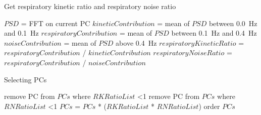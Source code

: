                     \begin{algorithm}
                        \caption{Get respiratory kinetic ratio and respiratory noise ratio}
                        \;
                        $PSD$ = \gls{FFT} on current \gls{PC}\;
                        \;
                        $kineticContribution$ = mean of $PSD$ between \SI{0.0}{\hertz} and \SI{0.1}{\hertz}\;
                        $respiratoryContribution$ = mean of $PSD$ between \SI{0.1}{\hertz} and \SI{0.4}{\hertz}\;
                        $noiseContribution$ = mean of $PSD$ above \SI{0.4}{\hertz}\;
                        \;
                        $respiratoryKineticRatio$ = $respiratoryContribution$ / $kineticContribution$\;
                        $respiratoryNoiseRatio$ = $respiratoryContribution$ / $noiseContribution$\;
                        \;
                    \end{algorithm} \label{eq:pca_data_driven_surrogate_signal_extraction_methods_for_dynamic_pet_methods_selecting_and_combining_pcs_get respiratory_kinetic_ratio_and_respiratory_noise_ratio_pseudo_code}
                    
                    \begin{algorithm}
                        \caption{Selecting \glspl{PC}}
                        \;
                        \;
                        remove \gls{PC} from $PCs$ where $RKRatioList$ \textless 1\;
                        remove \gls{PC} from $PCs$ where $RNRatioList$ \textless 1\;
                        \;
                        $PCs$ = $PCs$ * ($RKRatioList$ * $RNRatioList$)\;
                        order $PCs$\;
                    \end{algorithm} \label{eq:pca_data_driven_surrogate_signal_extraction_methods_for_dynamic_pet_methods_selecting_pcs_pseudo_code}
                    
